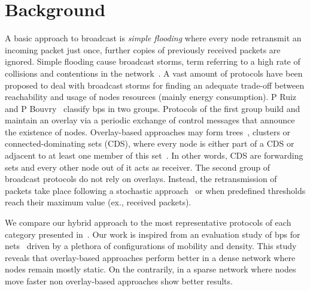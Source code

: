 \section{Background}
A basic approach to broadcast is \emph{simple flooding} where every node retransmit an incoming packet just once, further copies of previously received packets are ignored.
%
Simple flooding cause broadcast storms, term referring to a high rate of collisions and contentions in the network~\cite{Ni:1999:BSP:313451.313525}.
%
A vast amount of protocols have been proposed to deal with broadcast storms for finding an adequate trade-off between reachability and usage of nodes resources (mainly energy consumption).
%
P Ruiz and P Bouvry~\cite{Ruiz2015} classify \acl{bps} in two groups.
%
Protocols of the first group build and maintain an overlay via a periodic exchange of control messages that announce the existence of nodes.
%
Overlay-based approaches may form trees~\cite{796997}, clusters or connected-dominating sets (CDS), where every node is either part of a CDS or adjacent to at least one member of this set~\cite{Wu2001}.
%
In other words, CDS are forwarding sets and every other node out of it acts as receiver.
%
The second group of broadcast protocols do not rely on overlays.
%
Instead, the retransmission of packets take place following a stochastic approach~\cite{Kermarrec:2003} or when predefined thresholds reach their maximum value (ex., received packets).


%
We compare our hybrid approach to the most representative protocols of each category presented in~\cite{Ruiz2015}.
%
%
Our work is inspired from an evaluation study of \acl{bps} for \acs{nets}~\cite{7980187} driven by a plethora of configurations of mobility and density.
%
This study reveals that overlay-based approaches perform better in a dense network where nodes remain mostly static.
%
On the contrarily, in a sparse network where nodes move faster non overlay-based approaches show better results.
%

